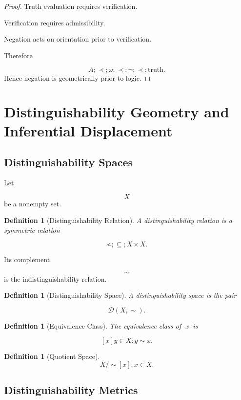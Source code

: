 \documentclass[12pt]{article}
\newtheorem{definition}[theorem]{Definition}
\theoremstyle{remark}
\begin{document}
\begin{proof}
Truth evaluation requires verification.

Verification requires admissibility.

Negation acts on orientation prior to verification.

Therefore

\[
A
;\prec;
\omega
;\prec;
\neg
;\prec;
\text{truth}.
\]
Hence negation is geometrically prior to logic.
\end{proof}

\section{Distinguishability Geometry and Inferential Displacement}

\subsection{Distinguishability Spaces}

Let

\[
X
\]
be a nonempty set.

\begin{definition}[Distinguishability Relation]
A distinguishability relation is a symmetric relation

\[
\not\sim
;\subseteq;
X\times X.
\]
\end{definition}
Its complement

\[
\sim
\]
is the indistinguishability relation.

\begin{definition}[Distinguishability Space]
A distinguishability space is the pair

\[
\mathcal D
(X,\sim).
\]
\end{definition}

\begin{definition}[Equivalence Class]
The equivalence class of x is

\[
[x]
{y\in X:y\sim x}.
\]
\end{definition}

\begin{definition}[Quotient Space]
\[
X/{\sim}
{
[x]:
x\in X
}.
\]
\end{definition}

\subsection{Distinguishability Metrics}
\end{document}

